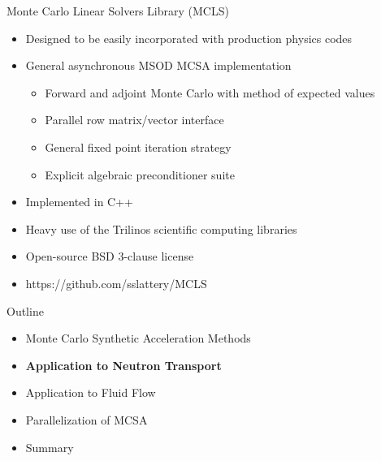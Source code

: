 \documentclass{beamer}
\begin{document}
\begin{frame}{Monte Carlo Linear Solvers Library (MCLS)}

  \begin{itemize}
  \item Designed to be easily incorporated with production physics
    codes
    \bigskip
  \item General asynchronous MSOD MCSA implementation
    \begin{itemize}
    \item Forward and adjoint Monte Carlo with method of expected
      values
    \item Parallel row matrix/vector interface
    \item General fixed point iteration strategy
    \item Explicit algebraic preconditioner suite
    \end{itemize}
    \medskip
  \item Implemented in C++
    \bigskip
  \item Heavy use of the Trilinos scientific computing libraries
    \bigskip
  \item Open-source BSD 3-clause license
    \bigskip
  \item https://github.com/sslattery/MCLS
  \end{itemize}

\end{frame}

\begin{frame}{Outline}

  \begin{itemize}
  \item Monte Carlo Synthetic Acceleration Methods
    \bigskip
  \item \textbf{Application to Neutron Transport}
    \bigskip
  \item Application to Fluid Flow
    \bigskip
  \item Parallelization of MCSA
    \bigskip
  \item Summary
  \end{itemize}

\end{frame}
\end{document}
